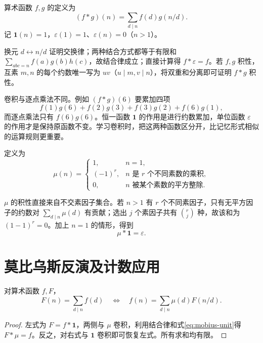 \documentclass[UTF8,12pt,a4paper,fontset=fandol]{ctexbook}
\begin{document}
\begin{definition}
算术函数 $f,g$ 的定义为
\begin{equation}
 (f*g)(n)=\sum_{d\mid n}f(d)g(n/d).
 \label{eq:dirichlet-convolution}
\end{equation}
记 $\mathbf1(n)=1$，$\varepsilon(1)=1$、$\varepsilon(n)=0$（$n>1$）。
\end{definition}

换元 $d\leftrightarrow n/d$ 证明交换律；两种结合方式都等于有限和 $\sum_{abc=n}f(a)g(b)h(c)$，故结合律成立；直接计算得 $f*\varepsilon=f$。若 $f,g$ 积性，互素 $m,n$ 的每个约数唯一写为 $uv$（$u\mid m,v\mid n$），将双重和分离即可证明 $f*g$ 积性。

卷积与逐点乘法不同。例如 $(f*g)(6)$ 要累加四项
\[
 f(1)g(6)+f(2)g(3)+f(3)g(2)+f(6)g(1),
\]
而逐点乘法只有 $f(6)g(6)$。恒一函数 $\mathbf1$ 的作用是进行约数累加，单位函数 $\varepsilon$ 的作用才是保持原函数不变。学习卷积时，把这两种函数区分开，比记忆形式相似的运算规则更重要。

\begin{definition}
定义为
\[
 \mu(n)=
 \begin{cases}
 1,&n=1,\\
 (-1)^r,&n\text{ 是 }r\text{ 个不同素数的乘积},\\
 0,&n\text{ 被某个素数的平方整除}.
 \end{cases}
\]
\end{definition}

$\mu$ 的积性直接来自不交素因子集合。若 $n>1$ 有 $r$ 个不同素因子，只有无平方因子的约数对 $\sum_{d\mid n}\mu(d)$ 有贡献；选出 $j$ 个素因子共有 $\binom rj$ 种，故该和为 $(1-1)^r=0$。加上 $n=1$ 的情形，得到
\begin{equation}
 \mu*\mathbf1=\varepsilon.
 \label{eq:mobius-unit}
\end{equation}

\section{莫比乌斯反演及计数应用}

\begin{theorem}[莫比乌斯反演]
\label{thm:mobius-inversion}
对算术函数 $f,F$，
\begin{equation}
 F(n)=\sum_{d\mid n}f(d)
 \quad\Longleftrightarrow\quad
 f(n)=\sum_{d\mid n}\mu(d)F(n/d).
 \label{eq:mobius-inversion}
\end{equation}
\end{theorem}
\begin{proof}
左式为 $F=f*\mathbf1$，两侧与 $\mu$ 卷积，利用结合律和式\eqref{eq:mobius-unit}得 $F*\mu=f$。反之，对右式与 $\mathbf1$ 卷积即可恢复左式。所有求和均有限。
\end{proof}
\end{document}
